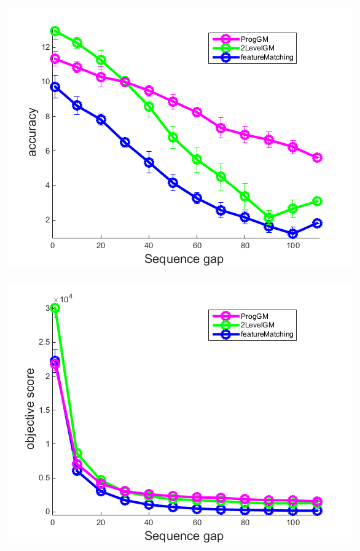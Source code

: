 \begin{figure}[h] \centering
		\begin{subfigure}[b]{0.33\textwidth}
			\centering
			\includegraphics[scale=0.25]{"chapter3/fig/HouseSeq2/anchor_descr/using_cpd_afftrafo/solution/performance/accuracy"} 
		\end{subfigure} 
		\begin{subfigure}[b]{0.33\textwidth}
			\centering
			\includegraphics[scale=0.25]{"chapter3/fig/HouseSeq2/anchor_descr/using_cpd_afftrafo/solution/performance/score"} 
		\end{subfigure}
		\begin{subfigure}[b]{0.32\textwidth}
			\centering

\end{subfigure}
\end{figure}
